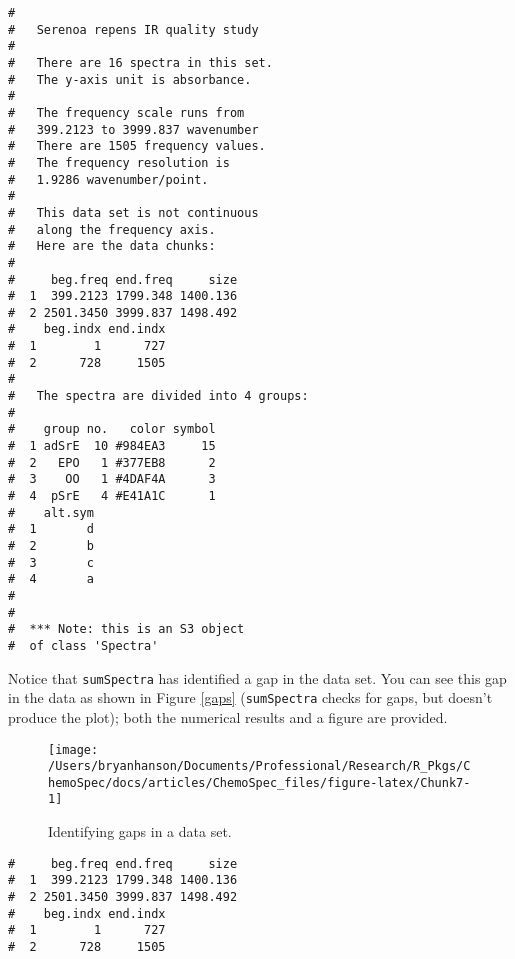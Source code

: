 \documentclass[letter,10pt,twocolumn,twoside,printwatermark=false]{pinp}
\begin{document}
\begin{ShadedResult}
\begin{verbatim}
#  
#   Serenoa repens IR quality study 
#  
#   There are 16 spectra in this set.
#   The y-axis unit is absorbance.
#  
#   The frequency scale runs from
#   399.2123 to 3999.837 wavenumber
#   There are 1505 frequency values.
#   The frequency resolution is
#   1.9286 wavenumber/point.
#  
#   This data set is not continuous
#   along the frequency axis.
#   Here are the data chunks:
#  
#     beg.freq end.freq     size
#  1  399.2123 1799.348 1400.136
#  2 2501.3450 3999.837 1498.492
#    beg.indx end.indx
#  1        1      727
#  2      728     1505
#  
#   The spectra are divided into 4 groups: 
#  
#    group no.   color symbol
#  1 adSrE  10 #984EA3     15
#  2   EPO   1 #377EB8      2
#  3    OO   1 #4DAF4A      3
#  4  pSrE   4 #E41A1C      1
#    alt.sym
#  1       d
#  2       b
#  3       c
#  4       a
#  
#  
#  *** Note: this is an S3 object
#  of class 'Spectra'
\end{verbatim}
\end{ShadedResult}

Notice that \texttt{sumSpectra} has identified a gap in the data set.
You can see this gap in the data as shown in Figure \ref{gaps}
(\texttt{sumSpectra} checks for gaps, but doesn't produce the plot);
both the numerical results and a figure are provided.

\begin{Shaded}
\begin{Highlighting}[]
\OperatorTok{$}\OperatorTok{$}\NormalTok{data[}\NormalTok{,])}
\end{Highlighting}
\end{Shaded}

\begin{figure}

{\centering \texttt{[image: /Users/bryanhanson/Documents/Professional/Research/R\_Pkgs/ChemoSpec/docs/articles/ChemoSpec\_files/figure-latex/Chunk7-1]} 

}

\caption{\label{gaps}Identifying gaps in a data set.}\label{fig:Chunk7}
\end{figure}
\begin{ShadedResult}
\begin{verbatim}
#     beg.freq end.freq     size
#  1  399.2123 1799.348 1400.136
#  2 2501.3450 3999.837 1498.492
#    beg.indx end.indx
#  1        1      727
#  2      728     1505
\end{verbatim}
\end{ShadedResult}
\end{document}
